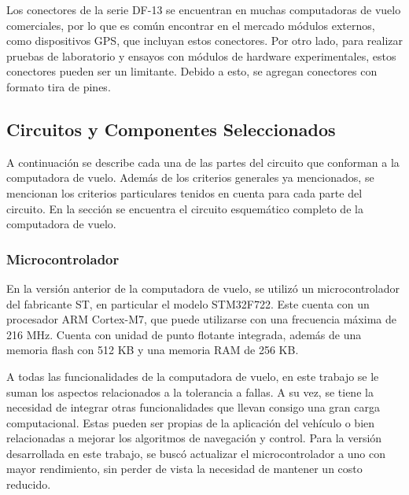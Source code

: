 Los conectores de la serie DF-13 se encuentran en muchas computadoras de vuelo comerciales, por lo que es común encontrar en el mercado módulos externos, como dispositivos GPS, que incluyan estos conectores. Por otro lado, para realizar pruebas de laboratorio y ensayos con módulos de hardware experimentales, estos conectores pueden ser un limitante. Debido a esto, se agregan conectores con formato tira de pines.

\subsection{Circuitos y Componentes Seleccionados}

A continuación se describe cada una de las partes del circuito que conforman a la computadora de vuelo. Además de los criterios generales ya mencionados, se mencionan los criterios particulares tenidos en cuenta para cada parte del circuito. En la sección  se encuentra el circuito esquemático completo de la computadora de vuelo.

\subsubsection{Microcontrolador}



En la versión anterior de la computadora de vuelo, se utilizó un microcontrolador del fabricante ST, en particular el modelo STM32F722. Este cuenta con un procesador ARM Cortex-M7, que puede utilizarse con una frecuencia máxima de 216 MHz. Cuenta con unidad de punto flotante integrada, además de una memoria flash con 512 KB y una memoria RAM de 256 KB.

A todas las funcionalidades de la computadora de vuelo, en este trabajo se le suman los aspectos relacionados a la tolerancia a fallas. A su vez, se tiene la necesidad de integrar otras funcionalidades que llevan consigo una gran carga computacional. Estas pueden ser propias de la aplicación del vehículo o bien relacionadas a mejorar los algoritmos de navegación y control. Para la versión desarrollada en este trabajo, se buscó actualizar el microcontrolador a uno con mayor rendimiento, sin perder de vista la necesidad de mantener un costo reducido.

